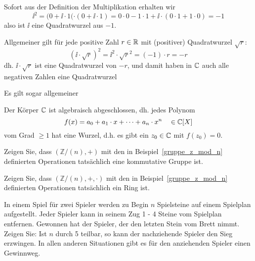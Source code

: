 
\begin{notiz}
Sofort aus der Definition der Multiplikation erhalten wir 
	$$ \ii^2 = (0 + \ii \cdot 1( \cdot (0 + \ii \cdot 1) = 0 \cdot 0 - 1 \cdot 1 + \ii \cdot (0 \cdot 1 + 1 \cdot 0) = - 1 $$
also ist $\ii$ eine Quadratwurzel aus $-1$. 

Allgemeiner gilt für jede positive Zahl $ r \in \mathbb R$ mit (positiver) Quadratwurzel $\sqrt{r}$: 
	$$ \left(\ii \cdot \sqrt{r} \right)^2 = \ii^2 \cdot \sqrt{r}^2 = (-1) \cdot r = - r $$
dh. $\ii \cdot \sqrt{r}$ ist eine Quadratwurzel von $-r$, und damit haben in $\mathbb C$ auch alle negativen Zahlen 
eine Quadratwurzel  
\end{notiz}

Es gilt sogar allgemeiner

\begin{satz} 
Der Körper $\mathbb C$ ist algebraisch abgeschlossen, dh. jedes Polynom 
	$$ f(x) = a_0 + a_1\cdot x + \cdots + a_n \cdot x^n \quad \in \mathbb C[X] $$
vom Grad $\geq 1$ hat eine Wurzel, d.h. es gibt ein $z_0 \in \mathbb C$ mit $f(z_0) = 0$.
\end{satz}

\bigbreak 

\bigbreak

\begin{aufgabe}\label{gruppe_aufg_z_mod_n_plus}
Zeigen Sie, dass $(\mathbb Z/ (n), +)$ mit den in Beispiel~\ref{gruppe_z_mod_n} definierten Operationen 
tatsächlich eine kommutative Gruppe ist.
\end{aufgabe}

\begin{aufgabe}\label{gruppe_aufg_z_mod_n_ring}
Zeigen Sie, dass $(\mathbb Z/ (n), +, \cdot )$ mit den in Beispiel~\ref{gruppe_z_mod_n} definierten Operationen 
tatsächlich ein Ring ist.
\end{aufgabe}

\begin{aufgabe} In einem Spiel für zwei Spieler werden zu Begin $n$ Spielsteine auf einem Spielplan 
aufgestellt. Jeder Spieler kann in seinem Zug 1 - 4 Steine vom Spielplan entfernen. Gewonnen hat der 
Spieler, der den letzten Stein vom Brett nimmt. Zeigen Sie: Ist $n$ durch 5 teilbar, so kann der nachziehende 
Spieler den Sieg erzwingen. In allen anderen Situationen gibt es für den anziehenden Spieler einen 
Gewinnweg.
\end{aufgabe}

